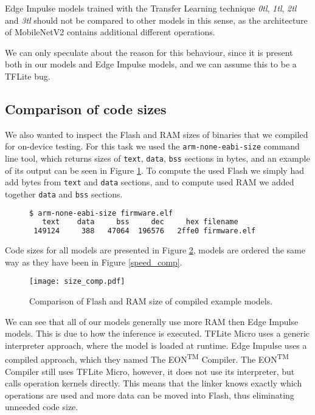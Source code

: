 Edge Impulse models trained with the Transfer Learning technique \textit{0tl}, \textit{1tl}, \textit{2tl} and \textit{3tl} should not be compared to other models in this sense, as the architecture of MobileNetV2 contains additional different operations.

We can only speculate about the reason for this behaviour, since it is present both in our models and Edge Impulse models, and we can assume this to be a TFLite bug.

\subsection{ Comparison of code sizes}

We also wanted to inspect the Flash and RAM sizes of binaries that we compiled for on-device testing.
For this task we used the \verb|arm-none-eabi-size| command line tool, which returns sizes of \verb|text|, \verb|data|, \verb|bss| sections in bytes, and an example of its output can be seen in Figure \ref{size_output}.
To compute the used Flash we simply had add bytes from \verb|text| and \verb|data| sections, and to compute used RAM we added together \verb|data| and \verb|bss| sections\footnotemark.
\lstset{style=mystyle}
\begin{figure}[ht] 
\begin{lstlisting}[language=bash]
$ arm-none-eabi-size firmware.elf
   text	   data	    bss	    dec	    hex	filename
 149124	    388	  47064	 196576	  2ffe0	firmware.elf
\end{lstlisting}
\label{size_output}
\end{figure}
\newline
Code sizes for all models are presented in Figure \ref{size_comp}, models are ordered the same way as they have been in Figure \ref{speed_comp}.
\begin{figure}[ht]
    \centering
    \texttt{[image: size\_comp.pdf]}
    \caption{ Comparison of Flash and RAM size of compiled example models.}
    \label{size_comp}
\end{figure}

We can see that all of our models generally use more RAM then Edge Impulse models.
This is due to how the inference is executed.
TFLite Micro uses a generic interpreter approach, where the model is loaded at runtime.
Edge Impulse uses a compiled approach, which they named The EON\textsuperscript{TM} Compiler\cite{eon}.
The EON\textsuperscript{TM} Compiler still uses TFLite Micro, however, it does not use its interpreter, but calls operation kernels directly.
This means that the linker knows exactly which operations are used and more data can be moved into Flash, thus eliminating unneeded code size\cite{eon}.


